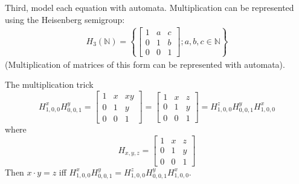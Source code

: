 \documentclass{beamer}
\begin{document}
\begin{frame}{Third, model each equation with automata.} 
  Multiplication can be represented using the Heisenberg semigroup:
  \begin{align*}
    H_3(\mathbb{N}) = \left\{
    \begin{bmatrix}
      1 & a & c \\
      0 & 1 & b \\
      0 & 0 & 1
    \end{bmatrix};
    a, b, c \in \mathbb{N}
    \right\}
  \end{align*}
  (Multiplication of matrices of this form can be represented with
  automata).
\end{frame}

\begin{frame}{The multiplication trick}
  \[
    H^x_{1,0,0} H^y_{0,0,1} =
    \begin{bmatrix}
      1 & x & xy \\
      0 & 1 & y \\
      0 & 0 & 1
    \end{bmatrix} = 
    \begin{bmatrix}
      1 & x & z \\
      0 & 1 & y \\
      0 & 0 & 1
    \end{bmatrix} = 
    H^z_{1,0,0} H^y_{0,0,1} H^x_{1,0,0}
  \]
where
\[
  H_{x,y,z} = 
      \begin{bmatrix}
        1 & x & z \\
        0 & 1 & y \\
        0 & 0 & 1
      \end{bmatrix}
\]
Then $x\cdot y = z$ iff
$H^x_{1,0,0} H^y_{0,0,1} = H^z_{1,0,0} H^y_{0,0,1} H^x_{1,0,0}$.
\end{frame}

\end{document}
